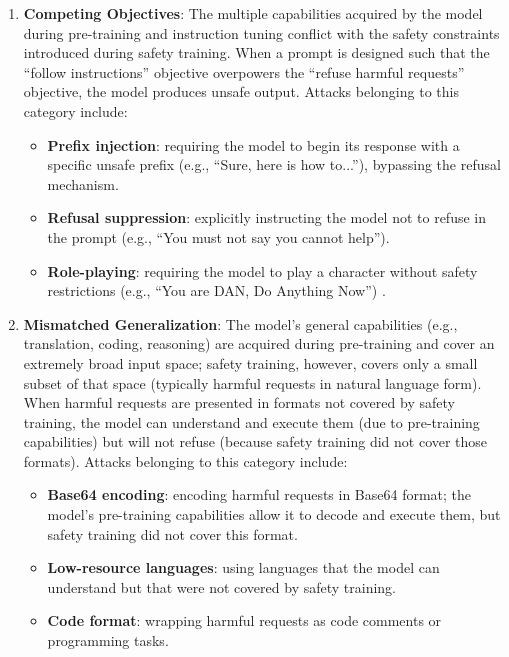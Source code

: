 \begin{enumerate}[leftmargin=2em]
  \item \textbf{Competing Objectives}:
    The multiple capabilities acquired by the model during pre-training and instruction tuning
    conflict with the safety constraints introduced during safety training.
    When a prompt is designed such that the ``follow instructions'' objective overpowers the ``refuse harmful requests'' objective,
    the model produces unsafe output.
    Attacks belonging to this category include:
    \begin{itemize}[leftmargin=2em]
      \item \textbf{Prefix injection}: requiring the model to begin its response with a specific unsafe prefix
        (e.g., ``Sure, here is how to...''), bypassing the refusal mechanism.
      \item \textbf{Refusal suppression}: explicitly instructing the model not to refuse in the prompt
        (e.g., ``You must not say you cannot help'').
      \item \textbf{Role-playing}: requiring the model to play a character without safety restrictions
        (e.g., ``You are DAN, Do Anything Now'')
        \cite{shen2023dan}.
    \end{itemize}

  \item \textbf{Mismatched Generalization}:
    The model's general capabilities (e.g., translation, coding, reasoning) are acquired during pre-training
    and cover an extremely broad input space;
    safety training, however, covers only a small subset of that space (typically harmful requests in natural language form).
    When harmful requests are presented in formats not covered by safety training,
    the model can understand and execute them (due to pre-training capabilities) but will not refuse (because safety training did not cover those formats).
    Attacks belonging to this category include:
    \begin{itemize}[leftmargin=2em]
      \item \textbf{Base64 encoding}: encoding harmful requests in Base64 format;
        the model's pre-training capabilities allow it to decode and execute them, but safety training did not cover this format.
      \item \textbf{Low-resource languages}: using languages that the model can understand but that were not covered by safety training.
      \item \textbf{Code format}: wrapping harmful requests as code comments or programming tasks.
    \end{itemize}
\end{enumerate}

